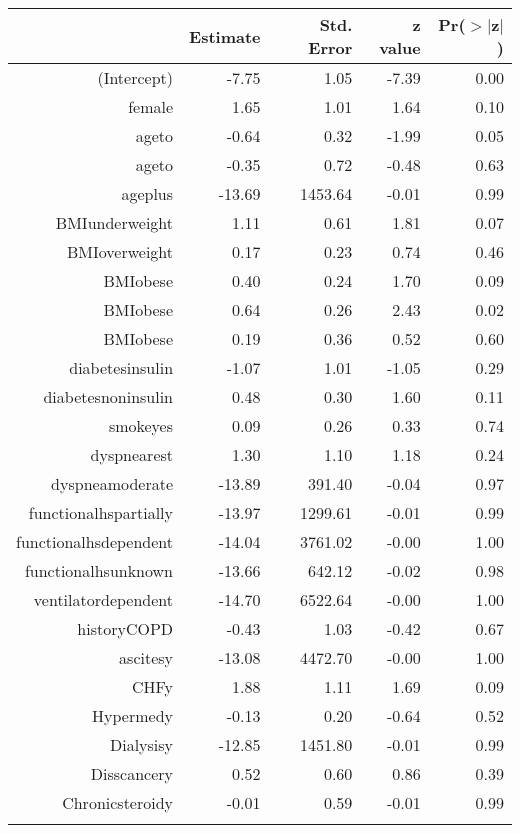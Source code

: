 \bigskip\bigskip
\centering
\begin{tabular}{rrrrr}
  \hline
 & Estimate & Std. Error & z value & Pr($>$$|$z$|$) \\ 
  \hline
(Intercept) & -7.75 & 1.05 & -7.39 & 0.00 \\ 
  female & 1.65 & 1.01 & 1.64 & 0.10 \\ 
  age\-65\-to\-74 & -0.64 & 0.32 & -1.99 & 0.05 \\ 
  age\-75\-to\-84 & -0.35 & 0.72 & -0.48 & 0.63 \\ 
  age\-85\-plus & -13.69 & 1453.64 & -0.01 & 0.99 \\ 
  BMI\-underweight & 1.11 & 0.61 & 1.81 & 0.07 \\ 
  BMI\-overweight & 0.17 & 0.23 & 0.74 & 0.46 \\ 
  BMI\-obese\-1 & 0.40 & 0.24 & 1.70 & 0.09 \\ 
  BMI\-obese\-2 & 0.64 & 0.26 & 2.43 & 0.02 \\ 
  BMI\-obese\-3 & 0.19 & 0.36 & 0.52 & 0.60 \\ 
  diabetes\-insulin & -1.07 & 1.01 & -1.05 & 0.29 \\ 
  diabetes\-noninsulin & 0.48 & 0.30 & 1.60 & 0.11 \\ 
  smoke\-yes & 0.09 & 0.26 & 0.33 & 0.74 \\ 
  dyspnea\-rest & 1.30 & 1.10 & 1.18 & 0.24 \\ 
  dyspnea\-moderate & -13.89 & 391.40 & -0.04 & 0.97 \\ 
  functional\-hs\-partially & -13.97 & 1299.61 & -0.01 & 0.99 \\ 
  functional\-hs\-dependent & -14.04 & 3761.02 & -0.00 & 1.00 \\ 
  functional\-hs\-unknown & -13.66 & 642.12 & -0.02 & 0.98 \\ 
  ventilator\-dependent & -14.70 & 6522.64 & -0.00 & 1.00 \\ 
  history\-COPD & -0.43 & 1.03 & -0.42 & 0.67 \\ 
  ascites\-y & -13.08 & 4472.70 & -0.00 & 1.00 \\ 
  CHF\-y & 1.88 & 1.11 & 1.69 & 0.09 \\ 
  Hyper\-med\-y & -0.13 & 0.20 & -0.64 & 0.52 \\ 
  Dialysis\-y & -12.85 & 1451.80 & -0.01 & 0.99 \\ 
  Diss\-cancer\-y & 0.52 & 0.60 & 0.86 & 0.39 \\ 
  Chronic\-steroid\-y & -0.01 & 0.59 & -0.01 & 0.99 \\ 
$$
\end{tabular}
